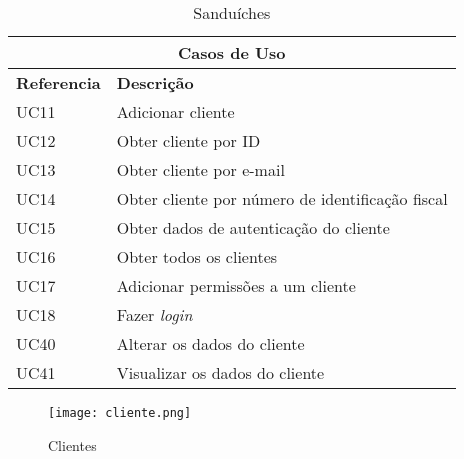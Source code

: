 \begin{table}[H]
\caption{Sanduíches}
\label{table:clientes}
\begin{center}
\begin{tabular}{ |p{2cm}|p{10cm}|  }
\hline
\multicolumn{2}{|c|}{Casos de Uso} \\
\hline
\textbf{Referencia} & \textbf{Descrição} \\
\hline
UC11 & Adicionar cliente\\
\hline
UC12 & Obter cliente por ID\\
\hline
UC13 & Obter cliente por e-mail\\
\hline
UC14 & Obter cliente por número de identificação fiscal\\
\hline
UC15 & Obter dados de autenticação do cliente\\
\hline
UC16 & Obter todos os clientes\\
\hline
UC17 & Adicionar permissões a um cliente\\
\hline
UC18 & Fazer \textit{login}\\
\hline
UC40 & Alterar os dados do cliente\\
\hline
UC41 & Visualizar os dados do cliente\\


\hline
\end{tabular} 
\end{center}
\end{table}

\begin{figure}[H]
    \centering
    \texttt{[image: cliente.png]}
    \caption{Clientes}
    \label{fig:clientes}
\end{figure}




